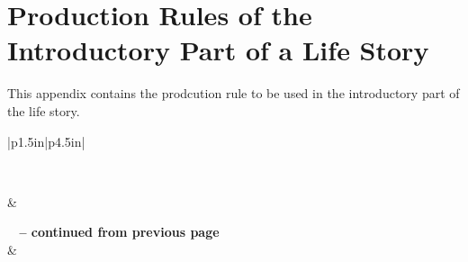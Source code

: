 %
%
%                 

\chapter{Production Rules of the Introductory Part of a Life Story}
\label{sec:appendixj}

This appendix contains the prodcution rule to be used in the introductory part of the life story. 

\begin{longtable}{|p{1.5in}|p{4.5in}|}
\caption{Production Rules of the Introductory Part of a Life Story.} \vspace{0.25em} \\ \hline 

\hline {} &  \\ \hline 
\endfirsthead

{{\bfseries \tablename\ \thetable{} -- continued from previous page}} \\
\hline {} &  \\ \hline 
\endhead

\hline {} \\ \hline
\endfoot

\hline \hline
\endlastfoot


\end{longtable}
